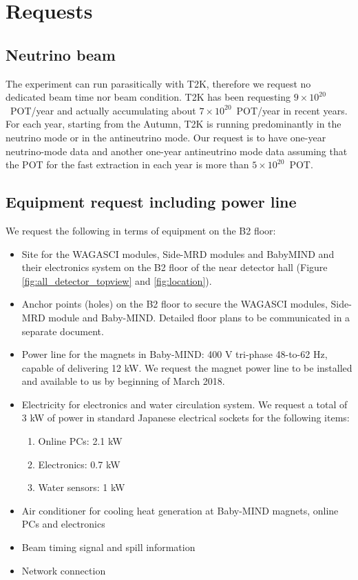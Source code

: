 \section{Requests}

\subsection{Neutrino beam}
The experiment can run parasitically with T2K, therefore we request no dedicated beam time nor beam condition.
T2K has been requesting
$9\times10^{20}$~POT/year and actually accumulating about $7\times10^{20}$~POT/year in recent years.
For each year, starting from the Autumn,  T2K is running predominantly in the neutrino mode or in the antineutrino mode.
Our request is to have one-year neutrino-mode data and another one-year antineutrino mode data
assuming that the POT for the fast extraction in each year is more than $5\times10^{20}$~POT.

\subsection{Equipment request including power line}
We request the following
in terms of equipment on the B2 floor:
\begin{itemize}
\item {Site for the WAGASCI modules, Side-MRD modules and BabyMIND and their electronics system on the B2 floor of the near detector hall (Figure \ref{fig:all_detector_topview} and \ref{fig:location}).}
\item {Anchor points (holes) on the B2 floor to secure the WAGASCI modules, Side-MRD module and Baby-MIND. Detailed floor plans to be communicated in a separate document.}
\item {Power line for the magnets in Baby-MIND: 400 V tri-phase 48-to-62 Hz, capable of delivering 12 kW. 
We request the magnet power line
to be installed and available to us by beginning of March 2018.}
\item Electricity for electronics and 
water circulation system. We request a total of 3 kW of power in standard Japanese electrical sockets for the following items:
	\begin{enumerate}
		\item Online PCs: 2.1 kW
		\item Electronics: 0.7 kW
		\item Water sensors: 1 kW
	\end{enumerate}
\item Air conditioner for cooling heat generation at Baby-MIND magnets, online PCs and electronics
\item Beam timing signal and spill information
\item Network connection
\end{itemize}

